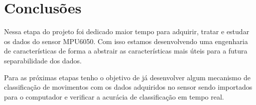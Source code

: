 \section{Conclusões}

Nessa etapa do projeto foi dedicado maior tempo para adquirir, tratar e estudar os dados do sensor MPU6050.
Com isso estamos desenvolvendo uma engenharia de características de forma a abstrair as características mais úteis para
a futura separabilidade dos dados.

Para as próximas etapas tenho o objetivo de já desenvolver algum mecanismo de classificação de movimentos com os dados adquiridos no sensor
sendo importados para o computador e verificar a acurácia de classificação em tempo real.


